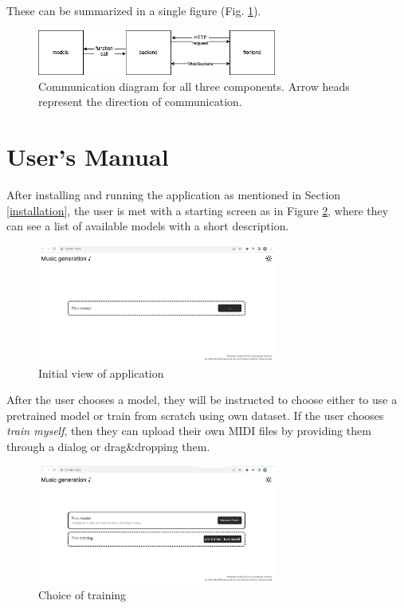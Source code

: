 \documentclass{article}
\begin{document}
These can be summarized in a single figure (Fig. \ref{fig:communication-diagram}).

\begin{figure}[H]
    \centering
    \includegraphics[width=0.7\textwidth]{communication_diagram.png}
    \caption{Communication diagram for all three components. Arrow heads represent the direction of communication.}
    \label{fig:communication-diagram}
\end{figure}


\section{User's Manual}
After installing and running the application as mentioned in Section \ref{installation}, the user is met with a starting screen as in Figure \ref{fig:app1}, where they can see a list of available models with a short description.

\begin{figure}[H]
    \centering
    \includegraphics[width=0.7\textwidth]{assets/app1.png}
    \caption{Initial view of application}
    \label{fig:app1}
\end{figure}

After the user chooses a model, they will be instructed to choose either to use a pretrained model or train from scratch using own dataset. If the user chooses \textit{train myself}, then they can upload their own MIDI  files by providing them through a dialog or drag\&dropping them.

\begin{figure}[H]
    \centering
    \includegraphics[width=0.7\textwidth]{assets/app2.png}
    \caption{Choice of training}
    \label{fig:app2}
\end{figure}
\end{document}
